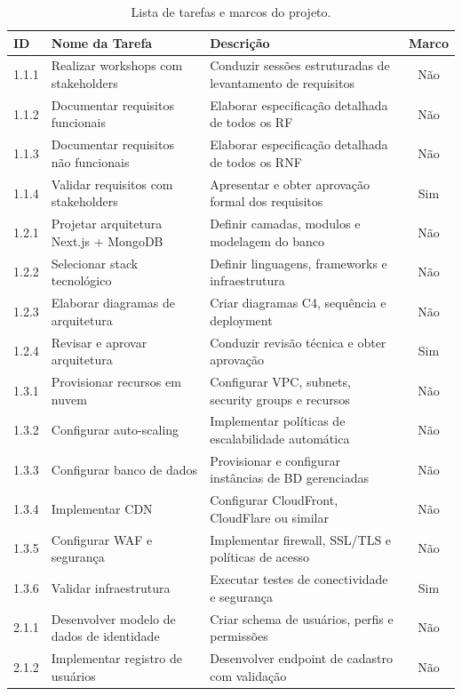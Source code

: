 \begin{table}[H]
\centering
\caption{Lista de tarefas e marcos do projeto.}%
\label{tab:tarefas}
\footnotesize
\begin{tabular}{|p{0.9cm}|p{6.2cm}|p{5.7cm}|c|}
\hline
\textbf{ID} & \textbf{Nome da Tarefa} & \textbf{Descrição} & \textbf{Marco} \\ \hline
1.1.1 & Realizar workshops com stakeholders & Conduzir sessões estruturadas de levantamento de requisitos & Não \\ \hline
1.1.2 & Documentar requisitos funcionais & Elaborar especificação detalhada de todos os RF & Não \\ \hline
1.1.3 & Documentar requisitos não funcionais & Elaborar especificação detalhada de todos os RNF & Não \\ \hline
1.1.4 & Validar requisitos com stakeholders & Apresentar e obter aprovação formal dos requisitos & Sim \\ \hline
1.2.1 & Projetar arquitetura Next.js + MongoDB & Definir camadas, modulos e modelagem do banco & Não \\ \hline
1.2.2 & Selecionar stack tecnológico & Definir linguagens, frameworks e infraestrutura & Não \\ \hline
1.2.3 & Elaborar diagramas de arquitetura & Criar diagramas C4, sequência e deployment & Não \\ \hline
1.2.4 & Revisar e aprovar arquitetura & Conduzir revisão técnica e obter aprovação & Sim \\ \hline
1.3.1 & Provisionar recursos em nuvem & Configurar VPC, subnets, security groups e recursos & Não \\ \hline
1.3.2 & Configurar auto-scaling & Implementar políticas de escalabilidade automática & Não \\ \hline
1.3.3 & Configurar banco de dados & Provisionar e configurar instâncias de BD gerenciadas & Não \\ \hline
1.3.4 & Implementar CDN & Configurar CloudFront, CloudFlare ou similar & Não \\ \hline
1.3.5 & Configurar WAF e segurança & Implementar firewall, SSL/TLS e políticas de acesso & Não \\ \hline
1.3.6 & Validar infraestrutura & Executar testes de conectividade e segurança & Sim \\ \hline
2.1.1 & Desenvolver modelo de dados de identidade & Criar schema de usuários, perfis e permissões & Não \\ \hline
2.1.2 & Implementar registro de usuários & Desenvolver endpoint de cadastro com validação & Não \\ \hline

\end{tabular}
\end{table}
